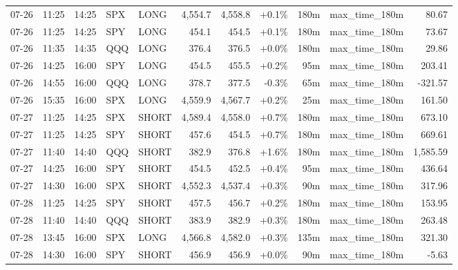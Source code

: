 \documentclass[11pt,a4paper,twoside]{article}
\begin{document}
\begin{center}
\begin{longtable}{>{\color{txtmain}}l l l l l r r r r >{\color{txtmain}}l r}
07-26 & 11:25 & 14:25 & SPX & LONG & 4,554.7 & 4,558.8 & \textcolor{wingreen}{+0.1\%} & 180m & max\_time\_180m & \textcolor{wingreen}{80.67} \\
07-26 & 11:25 & 14:25 & SPY & LONG & 454.1 & 454.5 & \textcolor{wingreen}{+0.1\%} & 180m & max\_time\_180m & \textcolor{wingreen}{73.67} \\
07-26 & 11:35 & 14:35 & QQQ & LONG & 376.4 & 376.5 & \textcolor{wingreen}{+0.0\%} & 180m & max\_time\_180m & \textcolor{wingreen}{29.86} \\
07-26 & 14:25 & 16:00 & SPY & LONG & 454.5 & 455.5 & \textcolor{wingreen}{+0.2\%} & 95m & max\_time\_180m & \textcolor{wingreen}{203.41} \\
07-26 & 14:55 & 16:00 & QQQ & LONG & 378.7 & 377.5 & \textcolor{lossred}{-0.3\%} & 65m & max\_time\_180m & \textcolor{lossred}{-321.57} \\
07-26 & 15:35 & 16:00 & SPX & LONG & 4,559.9 & 4,567.7 & \textcolor{wingreen}{+0.2\%} & 25m & max\_time\_180m & \textcolor{wingreen}{161.50} \\
07-27 & 11:25 & 14:25 & SPX & SHORT & 4,589.4 & 4,558.0 & \textcolor{wingreen}{+0.7\%} & 180m & max\_time\_180m & \textcolor{wingreen}{673.10} \\
07-27 & 11:25 & 14:25 & SPY & SHORT & 457.6 & 454.5 & \textcolor{wingreen}{+0.7\%} & 180m & max\_time\_180m & \textcolor{wingreen}{669.61} \\
07-27 & 11:40 & 14:40 & QQQ & SHORT & 382.9 & 376.8 & \textcolor{wingreen}{+1.6\%} & 180m & max\_time\_180m & \textcolor{wingreen}{1,585.59} \\
07-27 & 14:25 & 16:00 & SPY & SHORT & 454.5 & 452.5 & \textcolor{wingreen}{+0.4\%} & 95m & max\_time\_180m & \textcolor{wingreen}{436.64} \\
07-27 & 14:30 & 16:00 & SPX & SHORT & 4,552.3 & 4,537.4 & \textcolor{wingreen}{+0.3\%} & 90m & max\_time\_180m & \textcolor{wingreen}{317.96} \\
07-28 & 11:25 & 14:25 & SPY & SHORT & 457.5 & 456.7 & \textcolor{wingreen}{+0.2\%} & 180m & max\_time\_180m & \textcolor{wingreen}{153.95} \\
07-28 & 11:40 & 14:40 & QQQ & SHORT & 383.9 & 382.9 & \textcolor{wingreen}{+0.3\%} & 180m & max\_time\_180m & \textcolor{wingreen}{263.48} \\
07-28 & 13:45 & 16:00 & SPX & LONG & 4,566.8 & 4,582.0 & \textcolor{wingreen}{+0.3\%} & 135m & max\_time\_180m & \textcolor{wingreen}{321.30} \\
07-28 & 14:30 & 16:00 & SPY & SHORT & 456.9 & 456.9 & \textcolor{wingreen}{+0.0\%} & 90m & max\_time\_180m & \textcolor{lossred}{-5.63} \\

\end{longtable}
\end{center}
\end{document}
